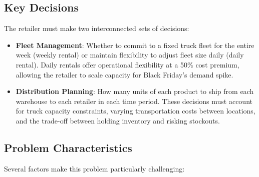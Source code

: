\documentclass[a4paper,12pt]{article}
\begin{document}
\subsection{Key Decisions}\label{subsec:key-decisions}

The retailer must make two interconnected sets of decisions:
\begin{itemize}
    \item \textbf{Fleet Management}: Whether to commit to a fixed truck fleet for the entire week (weekly rental) or maintain flexibility to adjust fleet size daily (daily rental).
Daily rentals offer operational flexibility at a 50\% cost premium, allowing the retailer to scale capacity for Black Friday's demand spike.

\item \textbf{Distribution Planning}: How many units of each product to ship from each warehouse to each retailer in each time period.
These decisions must account for truck capacity constraints, varying transportation costs between locations, and the trade-off between holding inventory and risking stockouts.
\end{itemize}

\subsection{Problem Characteristics}\label{subsec:problem-characteristics}

Several factors make this problem particularly challenging:
\end{document}

